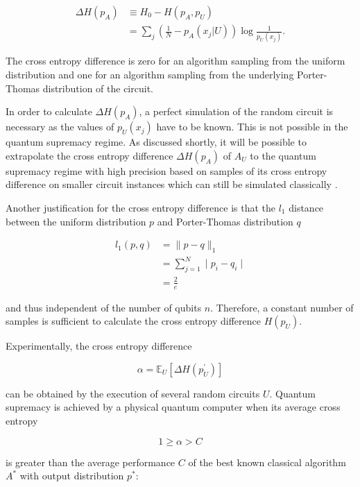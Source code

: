 \begin{align}
  \Delta H(p_A) &\equiv H_0 - H(p_A, p_U) \\
                 &=\sum_j \left(\frac{1}{N} - p_A(x_j|U)\right)\log{\frac{1}{p_U(x_j)}}.
\end{align}

The cross entropy difference is zero for an algorithm sampling from the uniform
distribution and one for an algorithm sampling from the underlying Porter-Thomas
distribution of the circuit.

In order to calculate $\Delta H(p_A)$, 
a perfect simulation of the random circuit is necessary as the values of $p_U(x_j)$ have to be known. This is not possible in the quantum
supremacy regime. As discussed shortly, it will be possible
to extrapolate the cross entropy difference $\Delta H(p_A)$ of $A_U$ to the quantum supremacy regime with high
precision based on samples of its cross entropy difference on smaller circuit
instances which can still be simulated classically \cite{Boixo2018supremacy}.

Another justification for the cross entropy difference is that the $l_1$ distance between the uniform distribution $p$ and Porter-Thomas distribution $q$

\begin{align}
  l_1(p,q) &= \| p-q\|_1 \\
           &= \sum_{j=1}^N \mid p_i - q_i \mid \\
           &= \frac{2}{e}
\end{align}

and thus independent of the number of qubits $n$. Therefore, a
constant number of samples is sufficient to calculate the cross entropy difference $H(p_U)$.

Experimentally, the cross entropy difference

\begin{equation}
  \alpha = \mathbb{E}_U[\Delta H(p^{\prime}_U)]
\end{equation}

can be obtained by the execution of several random circuits $U$. Quantum
supremacy is achieved by a physical quantum computer when its average cross
entropy

\begin{equation}
  1 \geq \alpha > C
\end{equation}

is greater than the average performance $C$ of the best known classical algorithm $A^*$ with 
output distribution $p^*$:

